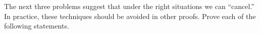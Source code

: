 %
%
The next three problems suggest that under the right situations we can ``cancel.''  In practice, these techniques should be avoided in other proofs.  Prove each of the following statements.\par\bigskip
%
